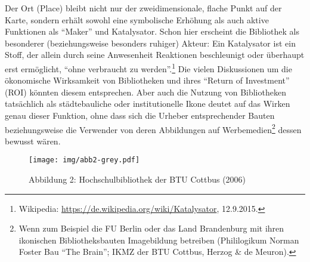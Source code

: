 Der Ort (Place) bleibt nicht nur der zweidimensionale, flache Punkt auf
der Karte, sondern erhält sowohl eine symbolische Erhöhung als auch
aktive Funktionen als \enquote{Maker} und Katalysator. Schon hier
erscheint die Bibliothek als besonderer (beziehungsweise besonders
ruhiger) Akteur: Ein Katalysator ist ein Stoff, der allein durch seine
Anwesenheit Reaktionen beschleunigt oder überhaupt erst ermöglicht,
\enquote{ohne verbraucht zu werden}.\footnote{Wikipedia:
  \url{https://de.wikipedia.org/wiki/Katalysator}, 12.9.2015.} Die
vielen Diskussionen um die ökonomische Wirksamkeit von Bibliotheken und
ihres \enquote{Return of Investment} (ROI) könnten diesem entsprechen.
Aber auch die Nutzung von Bibliotheken tatsächlich als städtebauliche
oder institutionelle Ikone deutet auf das Wirken genau dieser Funktion,
ohne dass sich die Urheber entsprechender Bauten beziehungsweise die
Verwender von deren Abbildungen auf Werbemedien\footnote{Wenn zum
  Beispiel die FU Berlin oder das Land Brandenburg mit ihren ikonischen
  Bibliotheksbauten Imagebildung betreiben (Phililogikum Norman Foster
  Bau \enquote{The Brain}; IKMZ der BTU Cottbus, Herzog \& de Meuron).}
dessen bewusst wären.

\begin{figure}[htbp]
\centering
\texttt{[image: img/abb2-grey.pdf]}
\caption*{Abbildung 2: Hochschulbibliothek der BTU Cottbus (2006)}
\end{figure}

